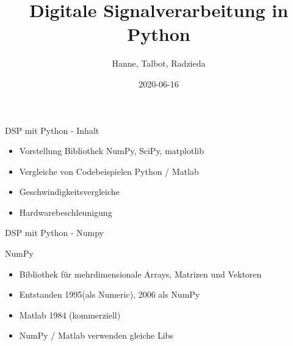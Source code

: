\documentclass[8pt]{beamer}
\author{Hanne, Talbot, Radzieda}
\date{2020-06-16}
\title{Digitale Signalverarbeitung in Python}
\begin{document}
\maketitle



\begin{frame}[label={sec:org7ee95bd}]{DSP mit Python - Inhalt}
\begin{itemize}
\item Vorstellung Bibliothek NumPy, SciPy, matplotlib
\item Vergleiche von Codebeispielen Python / Matlab
\item Geschwindigkeitsvergleiche
\item Hardwarebeschleunigung
\end{itemize}
\end{frame}


\begin{frame}[label={sec:org64f07e7}]{DSP mit Python - Numpy}
\begin{block}{NumPy}
\begin{itemize}
\item Bibliothek für mehrdimensionale Arrays, Matrizen und Vektoren
\item Entstanden 1995(als Numeric), 2006 als NumPy
\item Matlab 1984 (kommerziell)
\item NumPy / Matlab verwenden gleiche Libs
\end{itemize}
\end{block}
\end{frame}
\end{document}
